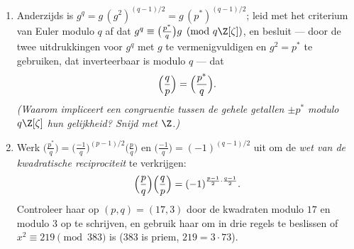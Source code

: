 \begin{problem}
\begin{enumerate}[resume]
\[        \]
        \emph{(droom van de eerstejaars: $(x + y)^q \equiv x^q +
        y^q$ modulo $q$ in elke commutatieve ring; vervolgens $g^q
        \equiv \sum_a\bigl(\frac ap\bigr)^q\zeta^{aq}$,
        herindexeer $b = aq$ en haal $\bigl(\frac{q^{-1}}p\bigr) =
        \bigl(\frac qp\bigr)$ naar buiten)}.
  \item Anderzijds is $g^q = g\,(g^2)^{(q-1)/2} =
        g\,(p^*)^{(q-1)/2}$; leid met het criterium van Euler
        modulo $q$ af dat $g^q \equiv \bigl(\frac{p^*}q\bigr)g
        \pmod{q\Z[\zeta]}$, en besluit --- door de twee
        uitdrukkingen voor $g^q$ met $g$ te vermenigvuldigen en
        $g^2 = p^*$ te gebruiken, dat inverteerbaar is modulo $q$
        --- dat
        \[
        \Bigl(\frac qp\Bigr) = \Bigl(\frac{p^*}q\Bigr) .
        \]
        \emph{(Waarom impliceert een congruentie tussen de gehele
        getallen $\pm p^*$ modulo $q\Z[\zeta]$ hun gelijkheid?
        Snijd met $\Z$.)}
  \item Werk $\bigl(\frac{p^*}q\bigr) =
        \bigl(\frac{-1}q\bigr)^{(p-1)/2}\bigl(\frac pq\bigr)$ en
        $\bigl(\frac{-1}q\bigr) = (-1)^{(q-1)/2}$ uit om de
        \emph{wet van de kwadratische reciprociteit} te
        verkrijgen:
        \[
        \Bigl(\frac pq\Bigr)\Bigl(\frac qp\Bigr)
        = (-1)^{\frac{p-1}2\cdot\frac{q-1}2} .
        \]
        Controleer haar op $(p, q) = (17, 3)$ door de kwadraten
        modulo $17$ en modulo $3$ op te schrijven, en gebruik haar
        om in drie regels te beslissen of $x^2 \equiv 219
        \pmod{383}$  is ($383$ is priem, $219 =
        3\cdot73$).
\end{enumerate}


\end{problem}
